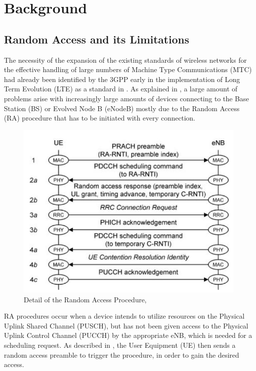 \chapter{Background}

\section{Random Access and its Limitations}\label{B:RA}
The necessity of the expansion of the existing standards of wireless networks for the effective handling of large numbers of Machine Type Communications (MTC) had already been identified by the 3GPP early in the implementation of Long Term Evolution (LTE) as a standard in \cite{3rdGenerationPartnershipProject;2011}. As explained in \cite{Laya2014}, a large amount of problems arise with increasingly large amounts of devices connecting to the Base Station (BS) or Evolved Node B (eNodeB) mostly due to the Random Access (RA) procedure that has to be initiated with every connection.

\begin{figure}[!h]
\centering
\includegraphics[scale = 0.45]{figures/Random_Access_Procedure}
\caption{Detail of the Random Access Procedure, \cite{Cox2012}}
\end{figure}

RA procedures occur when a device intends to utilize resources on the Physical Uplink Shared Channel (PUSCH), but has not been given access to the Physical Uplink Control Channel (PUCCH) by the appropriate eNB, which is needed for a scheduling request. As described in \cite{Cox2012}, the User Equipment (UE) then sends a random access preamble to trigger the procedure, in order to gain the desired access.

